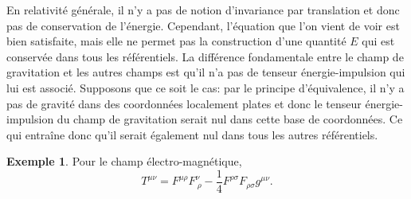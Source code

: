 \documentclass[a4paper,11pt]{report}
\theoremstyle{definition}
\theoremstyle{plain}
\theoremstyle{definition}
\newtheorem{exmp}{Exemple}[chapter]
\theoremstyle{remark}
\begin{document}
            En relativité générale, il n'y a pas de notion d'invariance par translation et donc pas de conservation de l'énergie. Cependant, l'équation que l'on vient de voir est bien satisfaite, mais elle ne permet pas la construction d'une quantité $E$ qui est conservée dans tous les référentiels. La différence fondamentale entre le champ de gravitation et les autres champs est qu'il n'a pas de tenseur énergie-impulsion qui lui est associé. Supposons que ce soit le cas: par le principe d'équivalence, il n'y a pas de gravité dans des coordonnées localement plates et donc le tenseur énergie-impulsion du champ de gravitation serait nul dans cette base de coordonnées. Ce qui entraîne donc qu'il serait également nul dans tous les autres référentiels.
            
            \begin{exmp}
                Pour le champ électro-magnétique, 
                \begin{equation}
                    T^{\mu\nu} = F^{\mu\rho}F^{\nu}_{~\rho}-\frac{1}{4}F^{\rho\sigma}F_{\rho\sigma}g^{\mu\nu}.
                \end{equation}
            \end{exmp}
            
\end{document}
